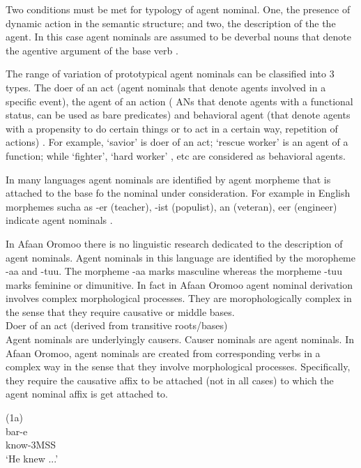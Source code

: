 \documentclass[11pt,a4paper]{article}
\begin{document}
Two conditions must be met for typology of agent nominal. One, the presence of dynamic action in the semantic structure; and two, the description of the the agent. In this case agent nominals are assumed to be deverbal nouns that denote the agentive argument of the base verb \cite[p-189-190]{huyghe2020s}.

The range of variation of prototypical agent nominals can be classified into 3 types. The doer of an act (agent nominals that denote agents involved in a specific event), the agent of an action ( ANs that denote agents with a functional status, can be used as bare predicates) and behavioral agent (that denote agents with a propensity to do certain things or to act in a certain way, repetition of actions) \cite[190-192]{huyghe2020s}. For example, ‘savior’  is doer of an act; ‘rescue worker’ is an agent of a function; while ‘fighter’, ‘hard worker’ , etc are considered as behavioral agents.

In many languages agent nominals are identified by agent morpheme that is attached to the base fo the nominal under consideration. For example in English morphemes sucha as -er (teacher), -ist (populist), an (veteran), eer (engineer) indicate agent nominals \cite[p-186]{huyghe2020s}.

In Afaan Oromoo there is no linguistic research dedicated to the description of agent nominals. Agent nominals in this language are identified by the moropheme -aa and -tuu. The morpheme -aa marks masculine whereas the morpheme -tuu marks feminine or dimunitive. In fact in Afaan Oromoo agent nominal derivation involves complex morphological processes. They are morophologically complex in the sense that they require causative or middle bases. \\

Doer of an act (derived from transitive roots/bases)\\

Agent nominals are underlyingly causers. Causer nominals are agent nominals. In Afaan Oromoo, agent nominals are created from corresponding verbs in a complex way in the sense that they involve morphological processes. Specifically, they require the causative affix to be attached (not in all cases) to which the agent nominal affix is get attached to. 

(1a)\\
\indent	 bar-e\\
\indent know-3MSS\\
\indent	‘He knew ...'\\
\end{document}
